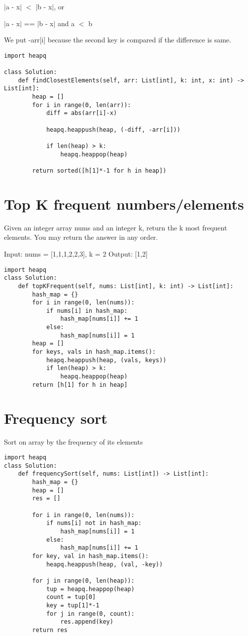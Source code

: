 \documentclass[24pt, a4]{article}
\begin{document}
$|$a - x$|$ $<$ $|$b - x$|$, or

$|$a - x$|$ == $|$b - x$|$ and a $<$ b

We put -arr[i] because the second key is compared if the difference is same.

\begin{lstlisting}
import heapq

class Solution:
    def findClosestElements(self, arr: List[int], k: int, x: int) -> List[int]:
        heap = []
        for i in range(0, len(arr)):
            diff = abs(arr[i]-x)
            
            heapq.heappush(heap, (-diff, -arr[i]))
            
            if len(heap) > k:
                heapq.heappop(heap)
        
        return sorted([h[1]*-1 for h in heap])
\end{lstlisting}

\section{Top K frequent numbers/elements}
Given an integer array nums and an integer k, return the k most frequent 
elements. You may return the answer in any order.

Input: nums = [1,1,1,2,2,3], k = 2 Output: [1,2]
\begin{lstlisting}
import heapq
class Solution:
    def topKFrequent(self, nums: List[int], k: int) -> List[int]:
        hash_map = {}
        for i in range(0, len(nums)):
            if nums[i] in hash_map:
                hash_map[nums[i]] += 1
            else:
                hash_map[nums[i]] = 1
        heap = []
        for keys, vals in hash_map.items():
            heapq.heappush(heap, (vals, keys))
            if len(heap) > k:
                heapq.heappop(heap)
        return [h[1] for h in heap]
\end{lstlisting}

\newpage
\section{Frequency sort}
Sort on array by the frequency of its elements

\begin{lstlisting}
import heapq
class Solution:
    def frequencySort(self, nums: List[int]) -> List[int]:
        hash_map = {}
        heap = []
        res = []
        
        for i in range(0, len(nums)):
            if nums[i] not in hash_map:
                hash_map[nums[i]] = 1
            else:
                hash_map[nums[i]] += 1
        for key, val in hash_map.items():
            heapq.heappush(heap, (val, -key))
        
        for j in range(0, len(heap)):
            tup = heapq.heappop(heap)
            count = tup[0]
            key = tup[1]*-1
            for j in range(0, count):
                res.append(key)
        return res
\end{lstlisting}
\end{document}
